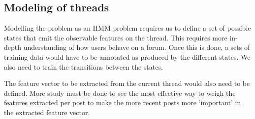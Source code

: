 \documentclass[12 pt]{article}
\begin{document}
\subsection{Modeling of threads}
Modelling the problem as an HMM problem requires us to define a set of possible states that emit the observable features on the thread. This requires more in-depth understanding of how users behave on a forum. Once this is done, a sets of training data would have to be annotated as produced by the different states. We also need to train the transitions between the states.

The feature vector to be extracted from the current thread would also need to be defined. More study must be done to see the most effective way to weigh the features extracted per post to make the more recent posts more `important' in the extracted feature vector.
\end{document}
